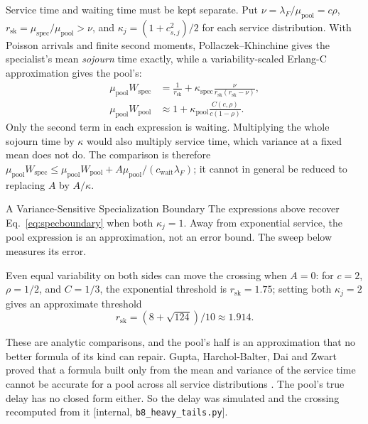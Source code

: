 \documentclass[11pt,a4paper]{article}
\theoremstyle{definition}
\theoremstyle{plain}
\begin{document}
Service time and waiting time must be kept separate. Put
$\nu=\lambda_F/\mu_{\mathrm{pool}}=c\rho$,
$r_{\mathrm{sk}}=\mu_{\mathrm{spec}}/\mu_{\mathrm{pool}}>\nu$, and
$\kappa_j=(1+c_{s,j}^2)/2$ for each service distribution. With Poisson arrivals
and finite second moments, Pollaczek--Khinchine gives the specialist's mean
\emph{sojourn} time exactly, while a variability-scaled Erlang-C approximation
 gives the pool's:
\begin{align}
 \mu_{\mathrm{pool}} W_{\mathrm{spec}}
   &= \frac{1}{r_{\mathrm{sk}}}+\kappa_{\mathrm{spec}}\frac{\nu}{r_{\mathrm{sk}}(r_{\mathrm{sk}}-\nu)},\\
 \mu_{\mathrm{pool}} W_{\mathrm{pool}}
   &\approx 1+\kappa_{\mathrm{pool}}
       \frac{C(c,\rho)}{c(1-\rho)}.
\end{align}
Only the second term in each expression is waiting. Multiplying the whole
sojourn time by $\kappa$ would also multiply service time, which variance at a
fixed mean does not do. The comparison is therefore
$\mu_{\mathrm{pool}}W_{\mathrm{spec}}\le
 \mu_{\mathrm{pool}}W_{\mathrm{pool}}+A\mu_{\mathrm{pool}}/(c_{\mathrm{wait}}\lambda_F)$;
it cannot in general be reduced to replacing $A$ by $A/\kappa$.

\begin{pdexample}{A Variance-Sensitive Specialization Boundary}
\setlength{\parskip}{4pt plus 1pt}
\label{hyp:spec-variance}
The expressions above recover Eq.~\ref{eq:specboundary} when both
$\kappa_j=1$. Away from exponential service, the pool expression is an
approximation, not an error bound. The sweep below measures its error.

Even equal variability on both sides can move
the crossing when $A=0$: for $c=2$, $\rho=1/2$, and $C=1/3$, the exponential
\mbox{threshold} is $r_{\mathrm{sk}}=1.75$; setting both $\kappa_j=2$ gives an approximate threshold
\[
r_{\mathrm{sk}}=(8+\sqrt{124})/10\approx1.914.
\]
\end{pdexample}

These are analytic comparisons, and the pool's half is an approximation
that no better formula of its kind can repair. Gupta, Harchol-Balter, Dai and
Zwart proved that a formula built only from the mean and variance of the
service time cannot be accurate for a pool across all service distributions
. The pool's true delay has no closed form either. So the
delay was simulated and the crossing recomputed from it
[internal, \texttt{b8\_heavy\_tails.py}].
\end{document}
